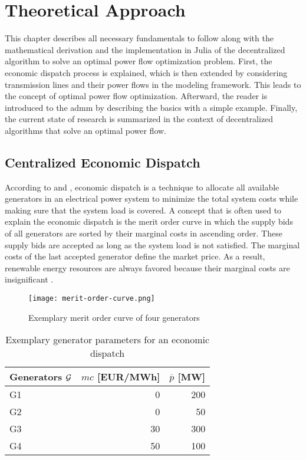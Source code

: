 \section{Theoretical Approach}
\label{sec:theo}

This chapter describes all necessary fundamentals to follow along with the mathematical derivation and the implementation in Julia of the decentralized algorithm to solve an optimal power flow optimization problem. First, the economic dispatch process is explained, which is then extended by considering transmission lines and their power flows in the modeling framework. This leads to the concept of optimal power flow optimization. Afterward, the reader is introduced to the \gls{admm} by describing the basics with a simple example. Finally, the current state of research is summarized in the context of decentralized algorithms that solve an optimal power flow.

\subsection{Centralized Economic Dispatch}
\label{sec:theo:ed}

According to \citet{chowdhury1990} and \citet{hetzer2008}, economic dispatch is a technique to allocate all available generators in an electrical power system to minimize the total system costs while making sure that the system load is covered. A concept that is often used to explain the economic dispatch is the merit order curve in which the supply bids of all generators are sorted by their marginal costs in ascending order. These supply bids are accepted as long as the system load is not satisfied. The marginal costs of the last accepted generator define the market price. As a result, renewable energy resources are always favored because their marginal costs are insignificant \citep{hetzer2008}. \\

\begin{figure}[h!]
	\centering
	\texttt{[image: merit-order-curve.png]}
	\caption{Exemplary merit order curve of four generators}
	\label{fig:merit}
\end{figure}

\begin{table}[h!]
    \centering
    \begin{tabular}{lrr}
        Generators $\mathcal{G}$ & $mc$ [EUR/MWh] & $\overline{p}$ [MW] \\ \toprule
        G1 & 0 & 200 \\
        G2 & 0 & 50 \\
        G3 & 30 & 300 \\
        G4 & 50 & 100 \\
        \bottomrule
    \end{tabular}
    \caption{Exemplary generator parameters for an economic dispatch} \label{tab:theo:gen-params}
\end{table}


